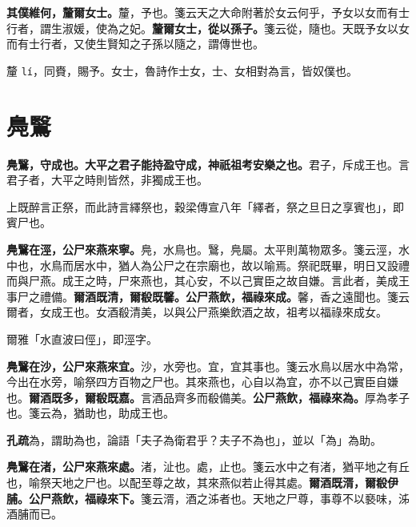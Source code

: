 \textbf{其僕維何，釐爾女士。}{\footnotesize 釐，予也。箋云天之大命附著於女云何乎，予女以女而有士行者，謂生淑媛，使為之妃。}\textbf{釐爾女士，從以孫子。}{\footnotesize 箋云從，隨也。天既予女以女而有士行者，又使生賢知之子孫以隨之，謂傳世也。}

\begin{quoting}釐 \texttt{lí}，同賚，賜予。女士，魯詩作士女，士、女相對為言，皆奴僕也。\end{quoting}

\section{鳧鷖}


\textbf{鳧鷖，守成也。大平之君子能持盈守成，神祇祖考安樂之也。}{\footnotesize 君子，斥成王也。言君子者，大平之時則皆然，非獨成王也。}

\begin{quoting}上既醉言正祭，而此詩言繹祭也，穀梁傳宣八年「繹者，祭之旦日之享賓也」，即賓尸也。\end{quoting}

\textbf{鳧鷖在涇，公尸來燕來寧。}{\footnotesize 鳧，水鳥也。鷖，鳧屬。太平則萬物眾多。箋云涇，水中也，水鳥而居水中，猶人為公尸之在宗廟也，故以喻焉。祭祀既畢，明日又設禮而與尸燕。成王之時，尸來燕也，其心安，不以己實臣之故自嫌。言此者，美成王事尸之禮備。}\textbf{爾酒既清，爾殽既馨。公尸燕飲，福祿來成。}{\footnotesize 馨，香之遠聞也。箋云爾者，女成王也。女酒殽清美，以與公尸燕樂飲酒之故，祖考以福祿來成女。}

\begin{quoting}爾雅「水直波曰俓」，即涇字。\end{quoting}

\textbf{鳧鷖在沙，公尸來燕來宜。}{\footnotesize 沙，水旁也。宜，宜其事也。箋云水鳥以居水中為常，今出在水旁，喻祭四方百物之尸也。其來燕也，心自以為宜，亦不以己實臣自嫌也。}\textbf{爾酒既多，爾殽既嘉。}{\footnotesize 言酒品齊多而殽備美。}\textbf{公尸燕飲，福祿來為。}{\footnotesize 厚為孝子也。箋云為，猶助也，助成王也。}

\begin{quoting}\textbf{孔疏}為，謂助為也，論語「夫子為衛君乎？夫子不為也」，並以「為」為助。\end{quoting}

\textbf{鳧鷖在渚，公尸來燕來處。}{\footnotesize 渚，沚也。處，止也。箋云水中之有渚，猶平地之有丘也，喻祭天地之尸也。以配至尊之故，其來燕似若止得其處。}\textbf{爾酒既湑，爾殽伊脯。公尸燕飲，福祿來下。}{\footnotesize 箋云湑，酒之泲者也。天地之尸尊，事尊不以褻味，泲酒脯而已。}

